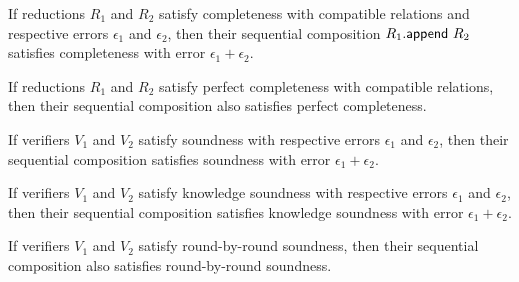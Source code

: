 \begin{theorem}
    \label{thm:completeness_append}
    If reductions $R_1$ and $R_2$ satisfy completeness with compatible relations and respective errors $\epsilon_1$ and $\epsilon_2$, then their sequential composition $R_1.\mathsf{append}\ R_2$ satisfies completeness with error $\epsilon_1 + \epsilon_2$.
\end{theorem}

\begin{theorem}
    \label{thm:perfect_completeness_append}
    If reductions $R_1$ and $R_2$ satisfy perfect completeness with compatible relations, then their sequential composition also satisfies perfect completeness.
\end{theorem}

\begin{theorem}
    \label{thm:soundness_append}
    If verifiers $V_1$ and $V_2$ satisfy soundness with respective errors $\epsilon_1$ and $\epsilon_2$, then their sequential composition satisfies soundness with error $\epsilon_1 + \epsilon_2$.
\end{theorem}

\begin{theorem}
    \label{thm:knowledge_soundness_append}
    If verifiers $V_1$ and $V_2$ satisfy knowledge soundness with respective errors $\epsilon_1$ and $\epsilon_2$, then their sequential composition satisfies knowledge soundness with error $\epsilon_1 + \epsilon_2$.
\end{theorem}

\begin{theorem}
    \label{thm:rbr_soundness_append}
    If verifiers $V_1$ and $V_2$ satisfy round-by-round soundness, then their sequential composition also satisfies round-by-round soundness.
\end{theorem}


